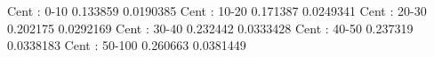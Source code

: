 Cent : 0-10
0.133859 0.0190385
Cent : 10-20
0.171387 0.0249341
Cent : 20-30
0.202175 0.0292169
Cent : 30-40
0.232442 0.0333428
Cent : 40-50
0.237319 0.0338183
Cent : 50-100
0.260663 0.0381449
